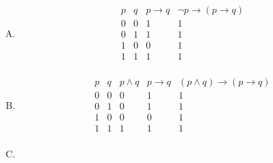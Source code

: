 {{\begin{practices}
\begin{enumerate}[A.]
{\begin{table}[H]
\[\begin{array}{c|c|c|c}
                                1 & 1 & 1 & 1 \\
                            \end{array}
                        \]
                    \end{table}
                }
                \item
                {
                    \begin{table}[H]
                        \[
                            \begin{array}{c|c|c|c}
                                \hline
                                p & q & p \rightarrow q & \neg p \rightarrow (p \rightarrow q) \\
                                \hline
                                0 & 0 & 1 & 1 \\
                                0 & 1 & 1 & 1 \\
                                1 & 0 & 0 & 1 \\
                                1 & 1 & 1 & 1 \\
                            \end{array}
                        \]
                    \end{table}
                }
                \item
                {
                    \begin{table}[H]
                        \[
                            \begin{array}{c|c|c|c|c}
                                \hline
                                p & q & p \wedge q & p \rightarrow q & (p \wedge q) \rightarrow (p \rightarrow q) \\
                                \hline
                                0 & 0 & 0 & 1 & 1 \\
                                0 & 1 & 0 & 1 & 1 \\
                                1 & 0 & 0 & 0 & 1 \\
                                1 & 1 & 1 & 1 & 1 \\
                            \end{array}
                        \]
                    \end{table}
                }
                \item
                {
                    \begin{table}[H]
                        \[
                            \begin{array}{c|c|c|c}

\end{array}\]
\end{table}}
\end{enumerate}
\end{practices}}}
